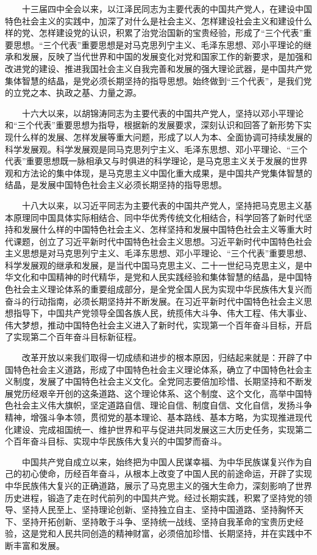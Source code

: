 　　十三届四中全会以来，以江泽民同志为主要代表的中国共产党人，在建设中国特色社会主义的实践中，加深了对什么是社会主义、怎样建设社会主义和建设什么样的党、怎样建设党的认识，积累了治党治国新的宝贵经验，形成了“三个代表”重要思想。“三个代表”重要思想是对马克思列宁主义、毛泽东思想、邓小平理论的继承和发展，反映了当代世界和中国的发展变化对党和国家工作的新要求，是加强和改进党的建设、推进我国社会主义自我完善和发展的强大理论武器，是中国共产党集体智慧的结晶，是党必须长期坚持的指导思想。始终做到“三个代表”，是我们党的立党之本、执政之基、力量之源。

　　十六大以来，以胡锦涛同志为主要代表的中国共产党人，坚持以邓小平理论和“三个代表”重要思想为指导，根据新的发展要求，深刻认识和回答了新形势下实现什么样的发展、怎样发展等重大问题，形成了以人为本、全面协调可持续发展的科学发展观。科学发展观是同马克思列宁主义、毛泽东思想、邓小平理论、“三个代表”重要思想既一脉相承又与时俱进的科学理论，是马克思主义关于发展的世界观和方法论的集中体现，是马克思主义中国化重大成果，是中国共产党集体智慧的结晶，是发展中国特色社会主义必须长期坚持的指导思想。

　　十八大以来，以习近平同志为主要代表的中国共产党人，坚持把马克思主义基本原理同中国具体实际相结合、同中华优秀传统文化相结合，科学回答了新时代坚持和发展什么样的中国特色社会主义、怎样坚持和发展中国特色社会主义等重大时代课题，创立了习近平新时代中国特色社会主义思想。习近平新时代中国特色社会主义思想是对马克思列宁主义、毛泽东思想、邓小平理论、“三个代表”重要思想、科学发展观的继承和发展，是当代中国马克思主义、二十一世纪马克思主义，是中华文化和中国精神的时代精华，是党和人民实践经验和集体智慧的结晶，是中国特色社会主义理论体系的重要组成部分，是全党全国人民为实现中华民族伟大复兴而奋斗的行动指南，必须长期坚持并不断发展。在习近平新时代中国特色社会主义思想指导下，中国共产党领导全国各族人民，统揽伟大斗争、伟大工程、伟大事业、伟大梦想，推动中国特色社会主义进入了新时代，实现第一个百年奋斗目标，开启了实现第二个百年奋斗目标新征程。

　　改革开放以来我们取得一切成绩和进步的根本原因，归结起来就是：开辟了中国特色社会主义道路，形成了中国特色社会主义理论体系，确立了中国特色社会主义制度，发展了中国特色社会主义文化。全党同志要倍加珍惜、长期坚持和不断发展党历经艰辛开创的这条道路、这个理论体系、这个制度、这个文化，高举中国特色社会主义伟大旗帜，坚定道路自信、理论自信、制度自信、文化自信，发扬斗争精神，增强斗争本领，贯彻党的基本理论、基本路线、基本方略，为实现推进现代化建设、完成祖国统一、维护世界和平与促进共同发展这三大历史任务，实现第二个百年奋斗目标、实现中华民族伟大复兴的中国梦而奋斗。

　　中国共产党自成立以来，始终把为中国人民谋幸福、为中华民族谋复兴作为自己的初心使命，历经百年奋斗，从根本上改变了中国人民的前途命运，开辟了实现中华民族伟大复兴的正确道路，展示了马克思主义的强大生命力，深刻影响了世界历史进程，锻造了走在时代前列的中国共产党。经过长期实践，积累了坚持党的领导、坚持人民至上、坚持理论创新、坚持独立自主、坚持中国道路、坚持胸怀天下、坚持开拓创新、坚持敢于斗争、坚持统一战线、坚持自我革命的宝贵历史经验，这是党和人民共同创造的精神财富，必须倍加珍惜、长期坚持，并在实践中不断丰富和发展。

